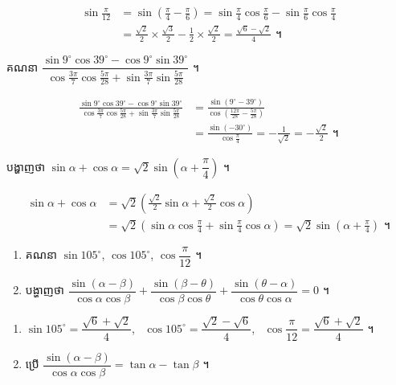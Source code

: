 \begin{example}[ឧទាហរណ៍ ៥]
\[
\begin{aligned}
\sin\frac{\pi}{12} &= \sin\left(\frac{\pi}{4} - \frac{\pi}{6}\right) = \sin\frac{\pi}{4}\cos\frac{\pi}{6} - \sin\frac{\pi}{6}\cos\frac{\pi}{4}\\
&= \frac{\sqrt{2}}{2} \times \frac{\sqrt{3}}{2} - \frac{1}{2} \times \frac{\sqrt{2}}{2} = \frac{\sqrt{6} - \sqrt{2}}{4} \text{ ។}
\end{aligned}
\]
\end{example}

\begin{example}[លំហាត់គំរូ ១]
គណនា $\dfrac{\sin 9^\circ\cos 39^\circ - \cos 9^\circ\sin 39^\circ}{\cos\frac{3\pi}{7}\cos\frac{5\pi}{28} + \sin\frac{3\pi}{7}\sin\frac{5\pi}{28}}$ ។
\end{example}
\ans
\[
\begin{aligned}
\frac{\sin 9^\circ\cos 39^\circ - \cos 9^\circ\sin 39^\circ}{\cos\frac{3\pi}{7}\cos\frac{5\pi}{28} + \sin\frac{3\pi}{7}\sin\frac{5\pi}{28}} &= \frac{\sin(9^\circ - 39^\circ)}{\cos\left(\frac{12\pi}{28} - \frac{5\pi}{28}\right)}\\
&= \frac{\sin(-30^\circ)}{\cos\frac{\pi}{4}} = -\frac{1}{\sqrt{2}} = -\frac{\sqrt{2}}{2} \text{ ។}
\end{aligned}
\]

\begin{example}[លំហាត់គំរូ ២]
បង្ហាញថា $\sin\alpha + \cos\alpha = \sqrt{2}\sin\left(\alpha + \dfrac{\pi}{4}\right)$ ។
\end{example}
\ans
\[
\begin{aligned}
\sin\alpha + \cos\alpha &= \sqrt{2}\left(\frac{\sqrt{2}}{2}\sin\alpha + \frac{\sqrt{2}}{2}\cos\alpha\right)\\
&= \sqrt{2}\left(\sin\alpha\cos\frac{\pi}{4} + \sin\frac{\pi}{4}\cos\alpha\right) = \sqrt{2}\sin\left(\alpha + \frac{\pi}{4}\right) \text{ ។}
\end{aligned}
\]

\begin{pro}
\begin{enumerate}[1]
  \item គណនា $\sin 105^\circ$, $\cos 105^\circ$, $\cos\dfrac{\pi}{12}$ ។
  \item បង្ហាញថា $\dfrac{\sin(\alpha - \beta)}{\cos\alpha\cos\beta} + \dfrac{\sin(\beta - \theta)}{\cos\beta\cos\theta} + \dfrac{\sin(\theta - \alpha)}{\cos\theta\cos\alpha} = 0$ ។
\end{enumerate}
\ans
\begin{enumerate}[1]
  \item $\sin 105^\circ = \dfrac{\sqrt{6} + \sqrt{2}}{4}$, \ $\cos 105^\circ = \dfrac{\sqrt{2} - \sqrt{6}}{4}$, \ $\cos\dfrac{\pi}{12} = \dfrac{\sqrt{6} + \sqrt{2}}{4}$ ។
  \item ប្រើ $\dfrac{\sin(\alpha - \beta)}{\cos\alpha\cos\beta} = \tan\alpha - \tan\beta$ ។
\end{enumerate}
\end{pro}


